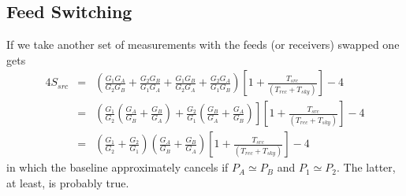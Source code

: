 \documentclass[a4paper,11pt]{article}
\begin{document}
\subsection{Feed Switching}

If we take another set of measurements with the feeds (or receivers) swapped
one gets
\begin{eqnarray*}
4 S_{src} &=& \left( \frac{G_1 G_A}{G_2 G_B} + \frac{G_2 G_B}{G_1 G_A}
                  +\frac{G_1 G_B}{G_2 G_A} + \frac{G_2 G_A}{G_1 G_B} \right)
          \left[1+\frac{T_{src}}{(T_{rec} + T_{sky})}\right] - 4 \\
          &=& \left( \frac{G_1}{G_2} \left( \frac{G_A}{G_B} + \frac{G_B}{G_A} \right)
                    +\frac{G_2}{G_1} \left( \frac{G_B}{G_A} + \frac{G_A}{G_B} \right)\right]
              \left[1+\frac{T_{src}}{(T_{rec} + T_{sky})}\right] - 4  \\
          &=& \left( \frac{G_1}{G_2} + \frac{G_2}{G_1} \right)
              \left( \frac{G_A}{G_B} + \frac{G_B}{G_A} \right)
              \left[1+\frac{T_{src}}{(T_{rec} + T_{sky})}\right] - 4 
\end{eqnarray*}
in which the baseline approximately cancels if $P_A \simeq P_B$ and
$P_1 \simeq P_2$.  The latter, at least, is probably true.
\end{document}
